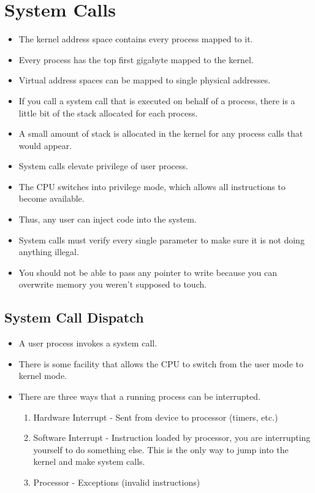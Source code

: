 \documentclass[]{article}
\begin{document}
\section{System Calls}
\begin{itemize}
\item The kernel address space contains every process mapped to it.
\item Every process has the top first gigabyte mapped to the kernel.
\item Virtual address spaces can be mapped to single physical addresses.
\item If you call a system call that is executed on behalf of a process, there
is a little bit of the stack allocated for each process.
\item A small amount of stack is allocated in the kernel for any process calls
that would appear.
\item System calls elevate privilege of user process.
\item The CPU switches into privilege mode, which allows all instructions to
become available.
\item Thus, any user can inject code into the system.
\item System calls must verify every single parameter to make sure it is not
doing anything illegal.
\item You should not be able to pass any pointer to write because you can
overwrite memory you weren't supposed to touch.
\end{itemize}

\subsection{System Call Dispatch}
\begin{itemize}
\item A user process invokes a system call.
\item There is some facility that allows the CPU to switch from the user mode to
kernel mode.
\item There are three ways that a running process can be interrupted.
\begin{enumerate}
\item Hardware Interrupt - Sent from device to processor (timers, etc.)
\item Software Interrupt - Instruction loaded by processor, you are interrupting
yourself to do something else. This is the only way to jump into the kernel and
make system calls.
\item Processor - Exceptions (invalid instructions)
\end{enumerate}
\end{itemize}
\end{document}

